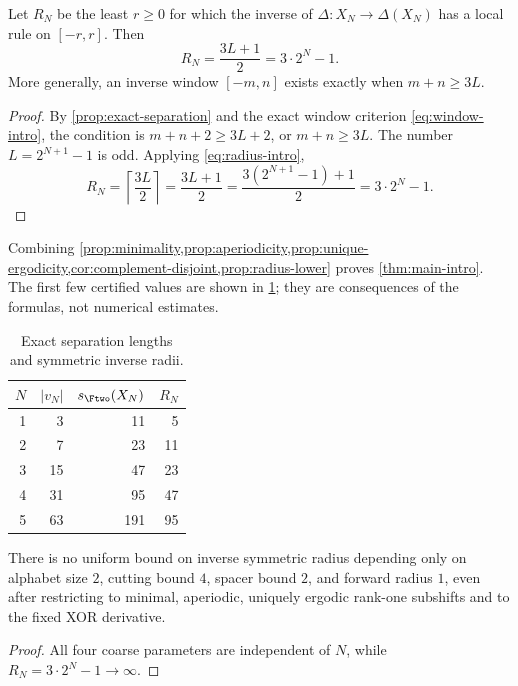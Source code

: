 \begin{proposition}\label{prop:radius-lower}
Let $R_N$ be the least $r\geq0$ for which the inverse of
$\Delta:X_N\to\Delta(X_N)$ has a local rule on $[-r,r]$.  Then
\[
 R_N=\frac{3L+1}{2}=3\cdot2^N-1.
\]
More generally, an inverse window $[-m,n]$ exists exactly when
$m+n\geq3L$.
\end{proposition}

\begin{proof}
By \cref{prop:exact-separation} and the exact window criterion
\eqref{eq:window-intro}, the condition is
$m+n+2\geq3L+2$, or $m+n\geq3L$.  The number
$L=2^{N+1}-1$ is odd.  Applying \eqref{eq:radius-intro},
\[
 R_N
 =\left\lceil\frac{3L}{2}\right\rceil
 =\frac{3L+1}{2}
 =\frac{3(2^{N+1}-1)+1}{2}
 =3\cdot2^N-1.
\]
\end{proof}

Combining
\cref{prop:minimality,prop:aperiodicity,prop:unique-ergodicity,cor:complement-disjoint,prop:radius-lower}
proves
\cref{thm:main-intro}.  The first few certified values are shown in
\cref{tab:values}; they are consequences of the formulas, not numerical
estimates.

\begin{table}[t]
\centering
\caption{Exact separation lengths and symmetric inverse radii.}
\label{tab:values}
\begin{tabular}{rrrr}
\toprule
$N$ & $|v_N|$ & $s_{\Ftwo}(X_N)$ & $R_N$\\
\midrule
1 & 3  & 11 & 5\\
2 & 7  & 23 & 11\\
3 & 15 & 47 & 23\\
4 & 31 & 95 & 47\\
5 & 63 & 191 & 95\\
\bottomrule
\end{tabular}
\end{table}

\begin{corollary}\label{cor:no-uniform}
There is no uniform bound on inverse symmetric radius depending only on
alphabet size $2$, cutting bound $4$, spacer bound $2$, and forward radius
$1$, even after restricting to minimal, aperiodic, uniquely ergodic rank-one
subshifts and to the fixed XOR derivative.
\end{corollary}

\begin{proof}
All four coarse parameters are independent of $N$, while
$R_N=3\cdot2^N-1\to\infty$.
\end{proof}
